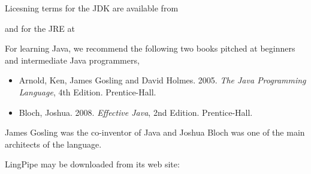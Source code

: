 Licesning terms for the JDK are available from
%
\begin{quote}
\end{quote}
%
and for the JRE at
%
\begin{quote}
\end{quote}


For learning Java, we recommend the following two books pitched at
beginners and intermediate Java programmers,
%
\begin{itemize}
\item Arnold, Ken, James Gosling and David Holmes.  2005.
{\it The Java Programming Language}, 4th Edition.  Prentice-Hall.
\item Bloch, Joshua. 2008. {\it Effective Java}, 2nd Edition.  Prentice-Hall.
\end{itemize}
%
James Gosling was the co-inventor of Java and Joshua Bloch was
one of the main architects of the language.






\noindent
LingPipe may be downloaded from its web site:

\begin{quote}
\end{quote}
